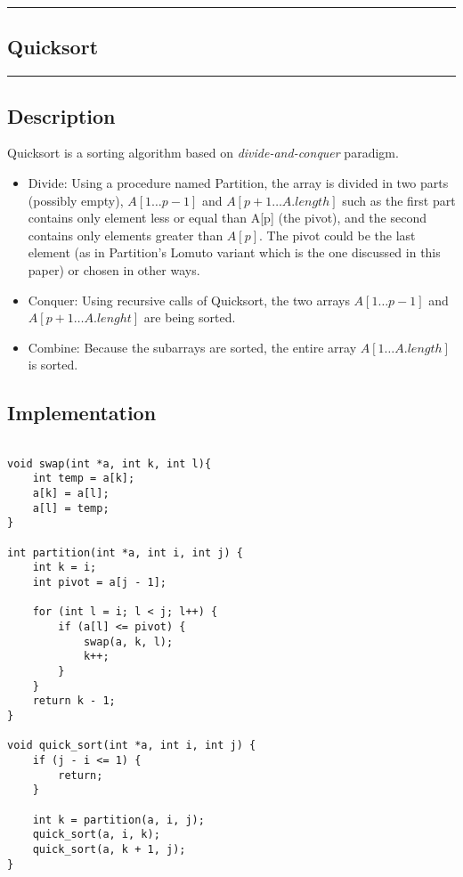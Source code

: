 {\color{gray}\hrule}
\begin{center}
\section{Quicksort}
\bigskip
\end{center}
{\color{gray}\hrule}
\begin{multicols}{2}

\subsection{Description}
Quicksort is a sorting algorithm based on \emph{divide-and-conquer} paradigm.
\begin{itemize}
\item{Divide: Using a procedure named Partition, the array is divided in two parts (possibly empty), $A[1\dots p-1]$ and $A[p+1\dots A.length]$ such as the first part contains only element less or equal than A[p] (the pivot), and the second contains only elements greater than $A[p]$. The pivot could be the last element (as in Partition's Lomuto variant which is the one discussed in this paper) or chosen in other ways.}
\item{Conquer: Using recursive calls of Quicksort, the two arrays $A[1\dots p-1]$ and $A[p+1\dots A.lenght]$ are being sorted.}
\item{Combine: Because the subarrays are sorted, the entire array $A[1\dots A.length]$ is sorted.}
\end{itemize}

\subsection{Implementation}
\begin{verbatim}

void swap(int *a, int k, int l){
    int temp = a[k];
    a[k] = a[l];
    a[l] = temp;
}

int partition(int *a, int i, int j) {
    int k = i;
    int pivot = a[j - 1];

    for (int l = i; l < j; l++) {
        if (a[l] <= pivot) {
            swap(a, k, l);
            k++;
        }
    }
    return k - 1;
}

void quick_sort(int *a, int i, int j) {
    if (j - i <= 1) {
        return;
    }

    int k = partition(a, i, j);
    quick_sort(a, i, k);
    quick_sort(a, k + 1, j);
}
\end{verbatim}


\end{multicols}
